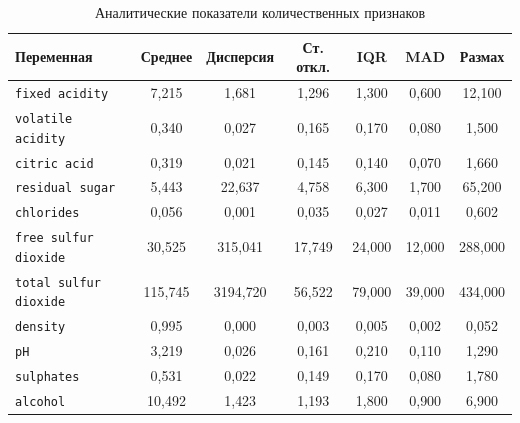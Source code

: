  \begin{table}[H]
 	\centering
 	\caption{Аналитические показатели количественных признаков}
 	\label{tab:analytical-statistics}
 	\scriptsize
 	
 	\begin{tabularx}{\textwidth}{LCCCCCC}
 		\hline
 		Переменная &
 		Среднее &
 		Дисперсия &
 		Ст. откл. &
 		IQR &
 		MAD &
 		Размах \\
 		\hline
 		
 		\texttt{fixed acidity} &
 		7{,}215 &
 		1{,}681 &
 		1{,}296 &
 		1{,}300 &
 		0{,}600 &
 		12{,}100 \\
 		
 		\texttt{volatile acidity} &
 		0{,}340 &
 		0{,}027 &
 		0{,}165 &
 		0{,}170 &
 		0{,}080 &
 		1{,}500 \\
 		
 		\texttt{citric acid} &
 		0{,}319 &
 		0{,}021 &
 		0{,}145 &
 		0{,}140 &
 		0{,}070 &
 		1{,}660 \\
 		
 		\texttt{residual sugar} &
 		5{,}443 &
 		22{,}637 &
 		4{,}758 &
 		6{,}300 &
 		1{,}700 &
 		65{,}200 \\
 		
 		\texttt{chlorides} &
 		0{,}056 &
 		0{,}001 &
 		0{,}035 &
 		0{,}027 &
 		0{,}011 &
 		0{,}602 \\
 		
 		\texttt{free sulfur dioxide} &
 		30{,}525 &
 		315{,}041 &
 		17{,}749 &
 		24{,}000 &
 		12{,}000 &
 		288{,}000 \\
 		
 		\texttt{total sulfur dioxide} &
 		115{,}745 &
 		3194{,}720 &
 		56{,}522 &
 		79{,}000 &
 		39{,}000 &
 		434{,}000 \\
 		
 		\texttt{density} &
 		0{,}995 &
 		0{,}000 &
 		0{,}003 &
 		0{,}005 &
 		0{,}002 &
 		0{,}052 \\
 		
 		\texttt{pH} &
 		3{,}219 &
 		0{,}026 &
 		0{,}161 &
 		0{,}210 &
 		0{,}110 &
 		1{,}290 \\
 		
 		\texttt{sulphates} &
 		0{,}531 &
 		0{,}022 &
 		0{,}149 &
 		0{,}170 &
 		0{,}080 &
 		1{,}780 \\
 		
 		\texttt{alcohol} &
 		10{,}492 &
 		1{,}423 &
 		1{,}193 &
 		1{,}800 &
 		0{,}900 &
 		6{,}900 \\
 		
 		\hline
 	\end{tabularx}
 \end{table}
 
